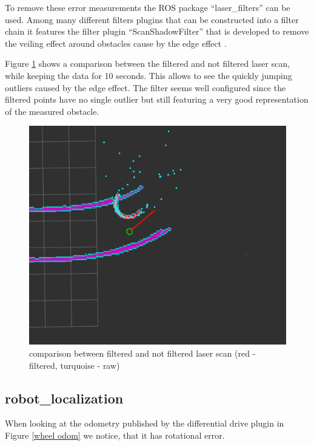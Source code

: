 To remove these error measurements the ROS package ``laser\_filters'' can be used. Among many different filters plugins that can be constructed into a filter chain it features the filter plugin ``ScanShadowFilter'' that is developed to remove the veiling effect around obstacles cause by the edge effect \cite{laserfilters}.

Figure \ref{lasercomp} shows a comparison between the filtered and not filtered laser scan, while keeping the data for 10 seconds. This allows to see the quickly jumping outliers caused by the edge effect. The filter seems well configured since the filtered points have no single outlier but still featuring a very good representation of the measured obstacle.

\begin{figure}[H]
	\includegraphics[width=\textwidth]{Pictures/LASERFILTER COMP}	
	\caption{comparison between filtered and not filtered laser scan (red - filtered, turquoise - raw)}
	\label{lasercomp}
\end{figure}


\subsection{robot\_localization}

When looking at the odometry published by the differential drive plugin in Figure \ref{wheel odom} we notice, that it has rotational error.\\

